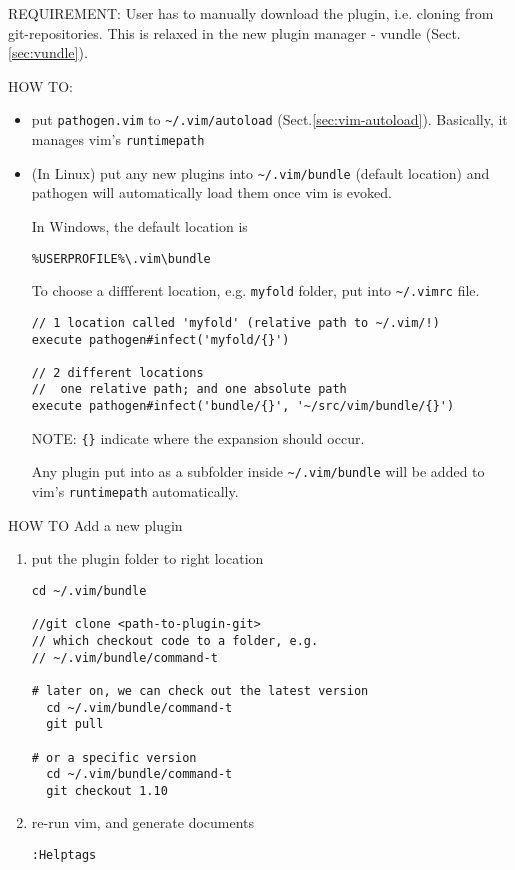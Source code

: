 REQUIREMENT: User has to manually download the plugin, i.e. cloning from
git-repositories. This is relaxed in the new plugin manager - vundle
(Sect.\ref{sec:vundle}).

HOW TO: 
\begin{itemize}
  \item  put \verb!pathogen.vim! to \verb!~/.vim/autoload!
  (Sect.\ref{sec:vim-autoload}). Basically, it manages vim's \verb!runtimepath!  
  
  \item (In Linux) put any new plugins into \verb!~/.vim/bundle! (default
  location) and pathogen will automatically load them once vim is evoked.

In Windows, the default location is
\begin{verbatim}
%USERPROFILE%\.vim\bundle
\end{verbatim}

To choose a diffferent location, e.g. \verb!myfold! folder, put into
\verb!~/.vimrc! file.

\begin{verbatim}  
// 1 location called 'myfold' (relative path to ~/.vim/!)
execute pathogen#infect('myfold/{}')

// 2 different locations
//  one relative path; and one absolute path
execute pathogen#infect('bundle/{}', '~/src/vim/bundle/{}')
\end{verbatim}
NOTE: \verb!{}! indicate where the expansion should occur.

Any plugin put into as a subfolder inside \verb!~/.vim/bundle! will be added to
vim's \verb!runtimepath! automatically. 
\end{itemize}  


HOW TO Add a new plugin
\begin{enumerate}
  \item put the plugin folder to right location

\begin{verbatim}
cd ~/.vim/bundle

//git clone <path-to-plugin-git>
// which checkout code to a folder, e.g.
// ~/.vim/bundle/command-t

# later on, we can check out the latest version
  cd ~/.vim/bundle/command-t
  git pull

# or a specific version
  cd ~/.vim/bundle/command-t
  git checkout 1.10
\end{verbatim}

  \item re-run vim, and generate documents
  
\begin{verbatim}
:Helptags
\end{verbatim}
\end{enumerate}

